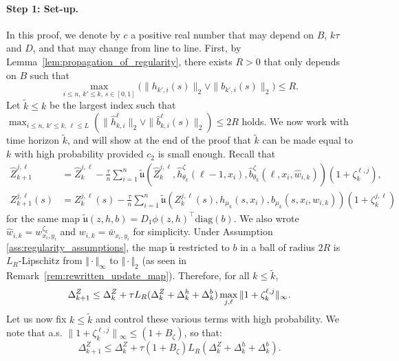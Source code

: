 \documentclass[a4paper,11pt]{article}
\newcommand{\1}{\mathbbm{1}}
\newcommand{\diag}{\mathrm{diag}}
\theoremstyle{definition}
\theoremstyle{remark}
\begin{document}
\paragraph{Step 1: Set-up.}
In this proof, we denote by $c$ a positive real number
that may depend on $B$, $k\tau$ and $D$, and that may change from line to line. First,
by Lemma~\ref{lem:propagation_of_regularity}, there exists $R > 0$ that only depends on $B$ such that
\[
  \max_{i \leq n,\, k' \leq k,\, s \in [0,1]}
  \bigl(\|h_{k',i}(s)\|_2 \vee \|b_{k',i}(s)\|_2\bigr) \leq R.
\]
Let $\tilde{k} \leq k$ be the largest index such that
$\max_{i \leq n,\, k' \leq k,\, \ell \leq L}
(\|\hat{h}^\ell_{k,i}\|_2 \vee \|\hat{b}^\ell_{k,i}(s)\|_2) \leq 2R$ holds. We now
work with time horizon $\tilde{k}$, and will show at the end of the proof that $\tilde{k}$
can be made equal to $k$ with high probability provided $c_2$ is small enough. Recall that
\begin{align*}
\hat{Z}^{j,\ell}_{k+1}
&= \hat{Z}^{j,\ell}_k
  - \frac{\tau}{n} \sum_{i=1}^{n}
    \tilde{\mathfrak{u}}(\hat{Z}^{j,\ell}_k, \hat{h}_{\theta_k}^{\zeta}(\ell-1, x_i), \hat{b}_{\theta_k}^{\zeta}(\ell, x_i, \hat{w}_{i,k})) (1+\zeta^{\ell,j}_k), \\
Z_{k+1}^{j,\ell}(s)
&= Z_k^{j,\ell}(s)
  - \frac{\tau}{n} \sum_{i=1}^{n}
    \tilde{\mathfrak{u}}(Z_k^{j,\ell}(s), h_{\mu_k}(s, x_i), b_{\mu_k}(s, x_i, w_{i,k}))(1+\zeta_k^{j,\ell})
\end{align*}
for the same map $\tilde{\mathfrak{u}}(z, h, b) = D_1\phi(z,h)^\top \diag(b)$. We also wrote $\hat{w}_{i,k} = w_{x_i,y_i}^{\zeta_k}$ and $w_{i,k} = \bar{w}_{x_i,y_i}$ for simplicity. Under Assumption \ref{ass:regularity_assumptions}, the map $\tilde{\mathfrak{u}}$
restricted to $b$ in a ball of radius $2R$ is $L_R$-Lipschitz {from $\Vert\cdot\Vert_\infty$ to $\Vert\cdot\Vert_2$} (as seen in Remark~\ref{rem:rewritten_update_map}). Therefore, for all
$k \leq \tilde{k}$,
\begin{equation}
  \Delta^Z_{k+1} \leq \Delta^Z_k + \tau L_R(\Delta^Z_k + \Delta^h_k + \Delta^b_k)\max_{j,\ell}\|1 + \zeta_k^{\ell,j}\|{_\infty}.  \notag
\end{equation}
Let us now fix $k \leq \tilde{k}$ and control these various terms with high probability. We note that a.s. \(\|1 + \zeta_k^{\ell,j}\|{_{\infty}}\leq (1+B_\zeta)\), so that:
\begin{equation}\label{eq:proof_thm_basic_bound}
  \Delta^Z_{k+1} \leq \Delta^Z_k + \tau(1+B_\zeta) L_R(\Delta^Z_k + \Delta^h_k + \Delta^b_k).  
\end{equation}
\end{document}
